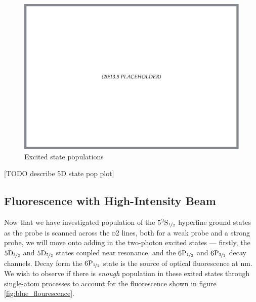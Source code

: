     \begin{figure}[]
    \includegraphics[width=\linewidth]{figs/20_135_placeholder.pdf}
    \caption{
    Excited state populations
    }
    \label{fig:strong_Dstate_pop} 
    \end{figure}    

    [TODO describe 5D state pop plot]

  \subsection{Fluorescence with High-Intensity Beam}

    Now that we have investigated population of the
    $5^2\rm{S}_{\nicefrac{1}{2}}$ hyperfine ground states as the probe is
    scanned across the \textsc{d2} lines, both for a weak probe and a strong
    probe, we will move onto adding in the two-photon excited states ---
    firstly, the $5\rm{D}_{\nicefrac{3}{2}}$ and $5\rm{D}_{\nicefrac{5}{2}}$
    states coupled near resonance, and the $6\rm{P}_{\nicefrac{1}{2}}$ and
    $6\rm{P}_{\nicefrac{3}{2}}$ decay channels. Decay form the
    $6\rm{P}_{\nicefrac{1}{2}}$ state is the source of optical fluorescence at
    \unit[422]{nm}. We wish to observe if there is \textit{enough} population in
    these exited states through single-atom processes to account for the
    fluorescence shown in figure \ref{fig:blue_flourescence}.

